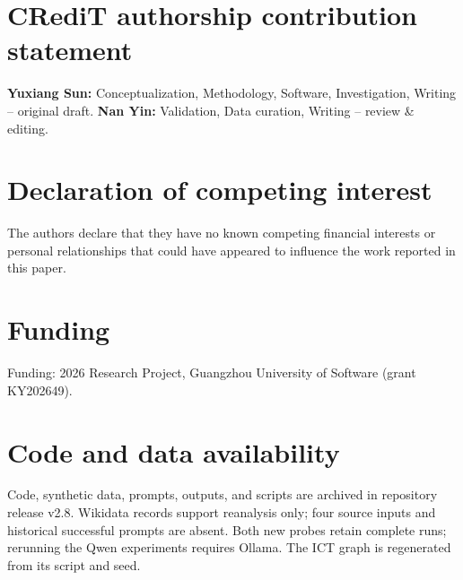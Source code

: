 \documentclass[a4paper,fleqn]{cas-dc}
\begin{document}
\footnotesize
\section*{CRediT authorship contribution statement}
\textbf{Yuxiang Sun:} Conceptualization, Methodology, Software, Investigation, Writing -- original draft. \textbf{Nan Yin:} Validation, Data curation, Writing -- review \& editing.

\section*{Declaration of competing interest}
The authors declare that they have no known competing financial interests or personal relationships that could have appeared to influence the work reported in this paper.

\section*{Funding}
Funding: 2026 Research Project, Guangzhou University of Software (grant KY202649).

\section*{Code and data availability}
Code, synthetic data, prompts, outputs, and scripts are archived in repository release v2.8. Wikidata records support reanalysis only; four source inputs and historical successful prompts are absent. Both new probes retain complete runs; rerunning the Qwen experiments requires Ollama. The ICT graph is regenerated from its script and seed.
\end{document}
